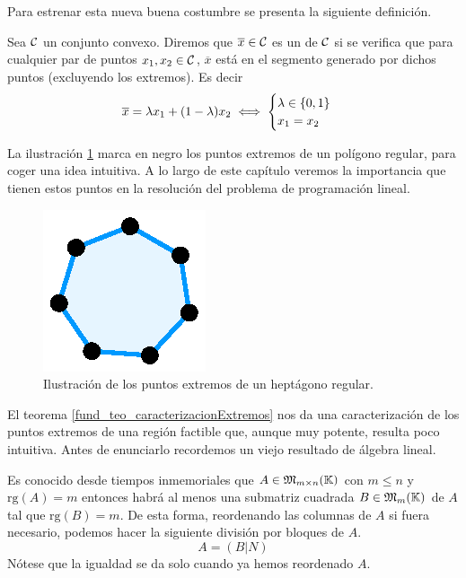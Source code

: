 Para estrenar esta nueva buena costumbre se presenta la siguiente definición.
\begin{defi}
	Sea $\mathcal{C}$ un conjunto convexo. Diremos que $\overline{x}\in\mathcal{C}$ es un  de $\mathcal{C}$ si se verifica que para cualquier par de puntos $x_1,x_2\in\mathcal{C}$, $\overline{x}$  está en el segmento generado por dichos puntos (excluyendo los extremos). Es decir
	\begin{equation*}
		\overline{x}=\lambda x_1+(1-\lambda)x_2\iff\begin{cases}
		\lambda\in\{0,1\}\\
		x_1=x_2
		\end{cases}
	\end{equation*}
\end{defi}
La ilustración \ref{fund_img_puntosExtremos} marca en negro los puntos extremos de un polígono regular, para coger una idea intuitiva. A lo largo de este capítulo veremos la importancia que tienen estos puntos en la resolución del problema de programación lineal.
\begin{figure}[h!]
	\centering
	\includegraphics[scale = 0.75]{img/puntosExtremos}
	\caption{Ilustración de los puntos extremos de un heptágono regular.}
	\label{fund_img_puntosExtremos}
\end{figure}
El teorema \ref{fund_teo_caracterizacionExtremos} nos da una caracterización de los puntos extremos de una región factible que, aunque muy potente, resulta poco intuitiva. Antes de enunciarlo recordemos un viejo resultado de álgebra lineal.
\begin{obs}
	\label{fund_obs_rango}
	Es conocido desde tiempos inmemoriales que $A\in\mathfrak{M}_{m\times n}(\mathbb{K})$ con $m\leq n$ y $\mathrm{rg}(A)=m$ entonces habrá al menos una submatriz cuadrada $B\in\mathfrak{M}_{m}(\mathbb{K})$ de $A$ tal que $\mathrm{rg}(B)=m$. De esta forma, reordenando las columnas de $A$ si fuera necesario, podemos hacer la siguiente división por bloques de $A$.
	\begin{equation*}
		A=(B|N)
	\end{equation*}
	Nótese que la igualdad se da solo cuando ya hemos reordenado $A$.
\end{obs}
